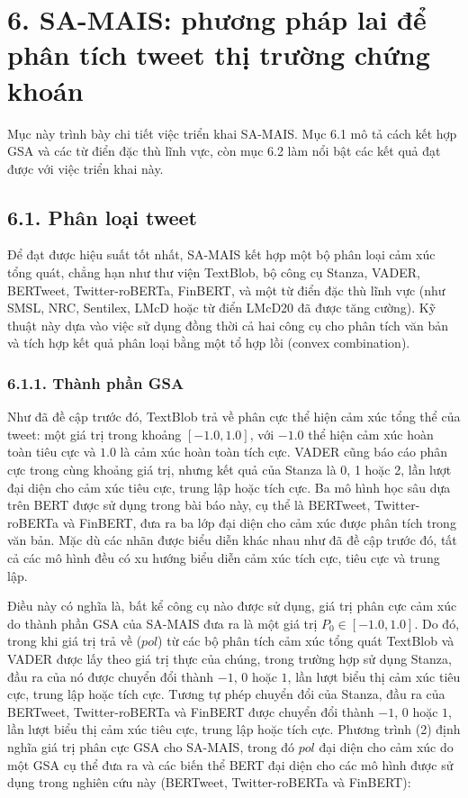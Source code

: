 \section{6. SA-MAIS: phương pháp lai để phân tích tweet thị trường chứng khoán}

Mục này trình bày chi tiết việc triển khai SA-MAIS. Mục 6.1 mô tả cách kết hợp GSA và các từ điển đặc thù lĩnh vực, còn mục 6.2 làm nổi bật các kết quả đạt được với việc triển khai này.

\subsection*{6.1. Phân loại tweet}

Để đạt được hiệu suất tốt nhất, SA-MAIS kết hợp một bộ phân loại cảm xúc tổng quát, chẳng hạn như thư viện TextBlob, bộ công cụ Stanza, VADER, BERTweet, Twitter-roBERTa, FinBERT, và một từ điển đặc thù lĩnh vực (như SMSL, NRC, Sentilex, LMcD hoặc từ điển LMcD20 đã được tăng cường). Kỹ thuật này dựa vào việc sử dụng đồng thời cả hai công cụ cho phân tích văn bản và tích hợp kết quả phân loại bằng một tổ hợp lồi (convex combination).

\subsubsection*{6.1.1. Thành phần GSA}

Như đã đề cập trước đó, TextBlob trả về phân cực thể hiện cảm xúc tổng thể của tweet: một giá trị trong khoảng $[-1.0, 1.0]$, với $-1.0$ thể hiện cảm xúc hoàn toàn tiêu cực và $1.0$ là cảm xúc hoàn toàn tích cực. VADER cũng báo cáo phân cực trong cùng khoảng giá trị, nhưng kết quả của Stanza là 0, 1 hoặc 2, lần lượt đại diện cho cảm xúc tiêu cực, trung lập hoặc tích cực. Ba mô hình học sâu dựa trên BERT được sử dụng trong bài báo này, cụ thể là BERTweet, Twitter-roBERTa và FinBERT, đưa ra ba lớp đại diện cho cảm xúc được phân tích trong văn bản. Mặc dù các nhãn được biểu diễn khác nhau như đã đề cập trước đó, tất cả các mô hình đều có xu hướng biểu diễn cảm xúc tích cực, tiêu cực và trung lập.

Điều này có nghĩa là, bất kể công cụ nào được sử dụng, giá trị phân cực cảm xúc do thành phần GSA của SA-MAIS đưa ra là một giá trị $P_0 \in [-1.0, 1.0]$. Do đó, trong khi giá trị trả về ($pol$) từ các bộ phân tích cảm xúc tổng quát TextBlob và VADER được lấy theo giá trị thực của chúng, trong trường hợp sử dụng Stanza, đầu ra của nó được chuyển đổi thành $-1$, $0$ hoặc $1$, lần lượt biểu thị cảm xúc tiêu cực, trung lập hoặc tích cực. Tương tự phép chuyển đổi của Stanza, đầu ra của BERTweet, Twitter-roBERTa và FinBERT được chuyển đổi thành $-1$, $0$ hoặc $1$, lần lượt biểu thị cảm xúc tiêu cực, trung lập hoặc tích cực. Phương trình (2) định nghĩa giá trị phân cực GSA cho SA-MAIS, trong đó $pol$ đại diện cho cảm xúc do một GSA cụ thể đưa ra và các biến thể BERT đại diện cho các mô hình được sử dụng trong nghiên cứu này (BERTweet, Twitter-roBERTa và FinBERT):

